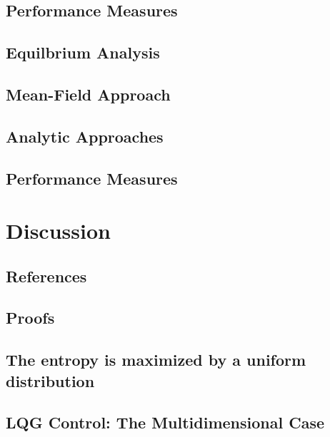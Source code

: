 \documentclass[justified,notitlepage]{tufte-book}
\begin{document}
\label{chap:optimal}

\section{Performance Measures}

\section{Equilbrium Analysis}

\section{Mean-Field Approach}

\section{Analytic Approaches}

\section{Performance Measures}

\chapter{Discussion}

\section{References}
{}


\begin{appendices}

\chapter{Proofs}
\section{The entropy is maximized by a uniform distribution}
\label{app:entropy}
\section{LQG Control: The Multidimensional Case}
\label{app:lqg}

\end{appendices}
\end{document}
